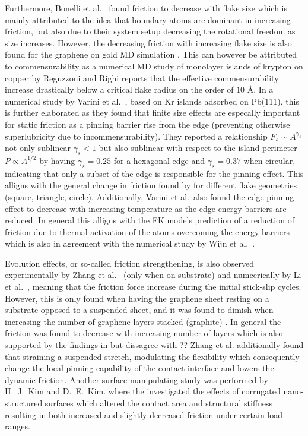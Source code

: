 Furthermore, Bonelli et al.\ \cite{bonelli_atomistic_2009} found friction to decrease with flake size which is mainly attributed to the idea that boundary
atoms are dominant in increasing friction, but also due to their system setup
decreasing the rotational freedom as size increases. However, the decreasing friction with increasing flake size is also found for the graphene on gold \acrshort{MD} simulation \cite{zhu_study_2018}. This can however be attributed to commensurability as a numerical \acrshort{MD} study of monolayer islands of krypton on copper by Reguzzoni and Righi \cite{PhysRevB.85.201412} reports that the effective commensurability increase drastically below a critical flake radius on the order of $10$ Å.  In a numerical study
by Varini et al.\ \cite{Varini_2015}, based on Kr islands adsorbed on Pb(111), this is further elaborated as they found that finite size effects are especally important for static friction as a pinning barrier rise from
the edge (preventing otherwise superlubricity due to incommensurability). They reported a relationship $F_s \sim A^{\gamma_s}$ not only sublinear $\gamma_s <
1$ but also sublinear with respect to the island perimeter $P \propto A^{1/2}$ by having $\gamma_s = 0.25$ for a hexagonal edge and $\gamma_s = 0.37$ when circular, indicating that only a subset of
the edge is responsible for the pinning effect. This alligns with the general change in friction found by \cite{zhu_study_2018} for different flake geometries (square, triangle, circle). Additionally, Varini et al.\ also found the edge pinning effect to decrease with increasing temperature as the edge energy barriers are reduced. In general this alligns with the \acrshort{FK} models prediction of a reduction of friction due to thermal activation of the atoms overcoming the energy barriers which is also in agreement with the numerical study by Wijn et al.\ \cite{Wijn_2011}. 


Evolution effects, or so-called friction strengthening, is also observed
experimentally by Zhang et al.\ \cite{zhang_tuning_2019} (only when on
substrate) and numcerically by Li et al.\ \cite{li_evolving_2016}, meaning that
the friction force increase during the initial stick-slip cycles. However, this
is only found when having the graphene sheet resting on a substrate
\cite{zhang_tuning_2019} opposed to a suspended sheet, and it was found to
dimish when increasing the number of graphene layers stacked (graphite)
\cite{li_evolving_2016}. In general the friction was found to decrease with
increasing number of layers which is also supported by the findings in
\cite{Yoon2015MolecularDS} but dissagree with \cite{Reguzzoni_2012}?? Zhang et
al. \cite{zhang_tuning_2019} additionally found that straining a suspended
stretch, modulating the flexibility which consequently change the local pinning
capability of the contact interface and lowers the dynamic friction. Another surface manipulating study was performed by H.\ J.\ Kim and D.\ E.\ Kim. \cite{Kim_2012} where the investigated the effects of corrugated
nano-structured surfaces which altered the contact area and structural stiffness resulting in both increased and slightly decreased friction under certain load ranges. 

